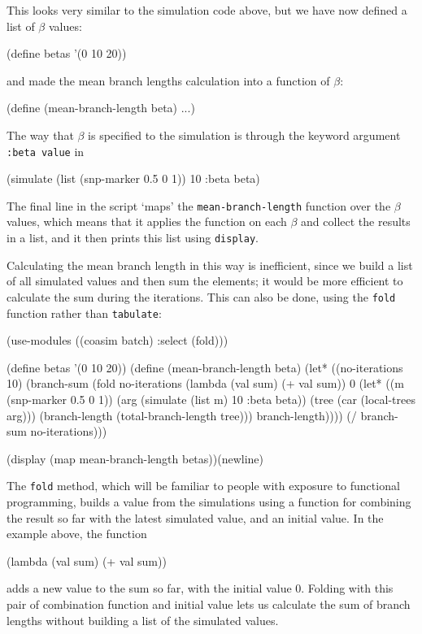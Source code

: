 \documentclass{manual}
\begin{document}
This looks very similar to the simulation code above, but we have now
defined a list of $\beta$ values:
\begin{code}
(define betas '(0 10 20))
\end{code}
and made the mean branch lengths calculation into a function of $\beta$:
\begin{code}
(define (mean-branch-length beta)
    ...)
\end{code}

The way that $\beta$ is specified to the simulation is through the
keyword argument \texttt{:beta value} in
\begin{code}
    (simulate (list (snp-marker 0.5 0 1)) 10 :beta beta)
\end{code}

The final line in the script `maps' the \texttt{mean-branch-length}
function over the $\beta$ values, which means that it applies the
function on each $\beta$ and collect the results in a list, and it
then prints this list using \texttt{display}.

Calculating the mean branch length in this way is inefficient, since
we build a list of all simulated values and then sum the elements; it
would be more efficient to calculate the sum during the iterations.
This can also be done, using the \texttt{fold} function rather than
\texttt{tabulate}:

\begin{code}
(use-modules ((coasim batch) :select (fold)))

(define betas '(0 10 20))
(define (mean-branch-length beta)
  (let* ((no-iterations 10)
         (branch-sum
          (fold no-iterations (lambda (val sum) (+ val sum)) 0
                (let* ((m (snp-marker 0.5 0 1))
                       (arg (simulate (list m) 10 :beta beta))
                       (tree (car (local-trees arg)))
                       (branch-length (total-branch-length tree)))
                  branch-length))))
    (/ branch-sum no-iterations)))

(display (map mean-branch-length betas))(newline)
\end{code}

The \texttt{fold} method, which will be familiar to people with
exposure to functional programming, builds a value from the
simulations using a function for combining the result so far with the
latest simulated value, and an initial value.  In the example above,
the function
\begin{code}
     (lambda (val sum) (+ val sum))
\end{code}
adds a new value to the sum so far, with the initial value 0.  Folding
with this pair of combination function and initial value lets us
calculate the sum of branch lengths without building a list of the
simulated values.
\end{document}
